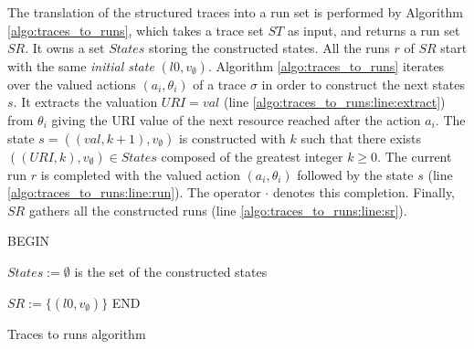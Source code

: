 The translation of the structured traces into a run set is
performed by Algorithm \ref{algo:traces_to_runs}, which takes a
trace set $ST$ as input, and returns a run set $SR$. It owns a
set $States$ storing the constructed states. All the runs $r$ of
$SR$ start with the same \emph{initial state} $(l0,v_\emptyset)$.
Algorithm \ref{algo:traces_to_runs} iterates over the valued actions
$(a_i,\theta_i)$ of a trace $\sigma$ in order to construct the
next states $s$. It extracts the valuation $URI=val$ (line
\ref{algo:traces_to_runs:line:extract}) from
$\theta_i$ giving the URI value of the next resource reached
after the action $a_i$. The state $s=((val,k+1),v_\emptyset)$ is
constructed with $k$ such that there exists
$((URI,k),v_\emptyset) \in States$ composed of the greatest
integer $k \geq 0$. The current run $r$ is completed with the
valued action $(a_i,\theta_i)$ followed by the state $s$ (line
\ref{algo:traces_to_runs:line:run}). The operator $\cdot$ denotes
this completion. Finally, $SR$ gathers all the constructed runs
(line \ref{algo:traces_to_runs:line:sr}).

\begin{algorithm}


BEGIN\;

$States:=\emptyset$ is the set of the constructed states\;

 {
    $SR:= \{(l0,v_\emptyset)\}$\;}
END\;

    \caption{Traces to runs algorithm}
    \label{algo:traces_to_runs}
\end{algorithm}

